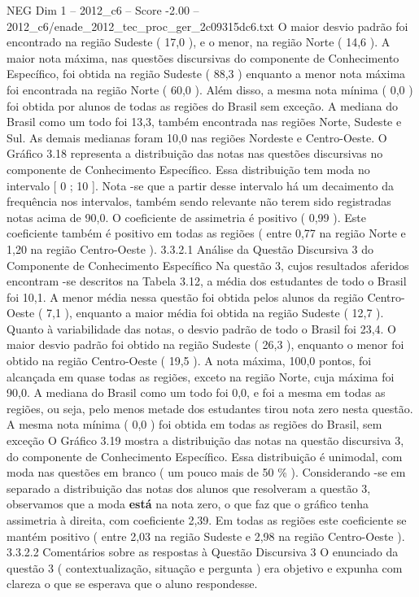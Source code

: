 \begin{textsample}{NEG Dim 1 – 2012\_c6 – Score -2.00 – 2012\_c6/enade\_2012\_tec\_proc\_ger\_2c09315dc6.txt}
O maior desvio padrão foi encontrado na região Sudeste ( 17,0 ), e o menor, na região Norte ( 14,6 ).
A maior nota máxima, nas questões discursivas do componente de Conhecimento Específico, foi obtida na região Sudeste ( 88,3 ) enquanto a menor nota máxima foi encontrada na região Norte ( 60,0 ).
Além disso, a mesma nota mínima ( 0,0 ) foi obtida por alunos de todas as regiões do Brasil sem exceção.
A mediana do Brasil como um todo foi 13,3, também encontrada nas regiões Norte, Sudeste e Sul.
As demais medianas foram 10,0 nas regiões Nordeste e Centro-Oeste.
O Gráfico 3.18 representa a distribuição das notas nas questões discursivas no componente de Conhecimento Específico.
Essa distribuição tem moda no intervalo [ 0 ; 10 ].
Nota -se que a partir desse intervalo há um decaimento da frequência nos intervalos, também sendo relevante não terem sido registradas notas acima de 90,0.
O coeficiente de assimetria é positivo ( 0,99 ).
Este coeficiente também é positivo em todas as regiões ( entre 0,77 na região Norte e 1,20 na região Centro-Oeste ). 3.3.2.1 Análise da Questão Discursiva 3 do Componente de Conhecimento Específico Na questão 3, cujos resultados aferidos encontram -se descritos na Tabela 3.12, a média dos estudantes de todo o Brasil foi 10,1.
A menor média nessa questão foi obtida pelos alunos da região Centro-Oeste ( 7,1 ), enquanto a maior média foi obtida na região Sudeste ( 12,7 ).
Quanto à variabilidade das notas, o desvio padrão de todo o Brasil foi 23,4.
O maior desvio padrão foi obtido na região Sudeste ( 26,3 ), enquanto o menor foi obtido na região Centro-Oeste ( 19,5 ).
A nota máxima, 100,0 pontos, foi alcançada em quase todas as regiões, exceto na região Norte, cuja máxima foi 90,0.
A mediana do Brasil como um todo foi 0,0, e foi a mesma em todas as regiões, ou seja, pelo menos metade dos estudantes tirou nota zero nesta questão.
A mesma nota mínima ( 0,0 ) foi obtida em todas as regiões do Brasil, sem exceção O Gráfico 3.19 mostra a distribuição das notas na questão discursiva 3, do componente de Conhecimento Específico.
Essa distribuição é unimodal, com moda nas questões em branco ( um pouco mais de 50 \% ).
Considerando -se em separado a distribuição das notas dos alunos que resolveram a questão 3, observamos que a moda \textbf{está} na nota zero, o que faz que o gráfico tenha assimetria à direita, com coeficiente 2,39.
Em todas as regiões este coeficiente se mantém positivo ( entre 2,03 na região Sudeste e 2,98 na região Centro-Oeste ). 3.3.2.2 Comentários sobre as respostas à Questão Discursiva 3 O enunciado da questão 3 ( contextualização, situação e pergunta ) era objetivo e expunha com clareza o que se esperava que o aluno respondesse.

\end{textsample}
